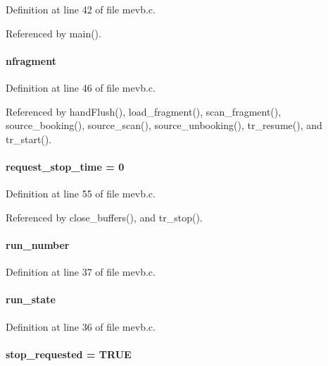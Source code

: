 Definition at line 42 of file mevb.c.

Referenced by main().
\paragraph[{nfragment}]{ {\bf nfragment}}\hfill\label{mevb_8c_ae4c245d2fd266607104c0ceb0bd946bf}


Definition at line 46 of file mevb.c.

Referenced by handFlush(), load\_\-fragment(), scan\_\-fragment(), source\_\-booking(), source\_\-scan(), source\_\-unbooking(), tr\_\-resume(), and tr\_\-start().
\paragraph[{request\_\-stop\_\-time}]{ {\bf request\_\-stop\_\-time} = 0}\hfill\label{mevb_8c_ae237aa4969c90d76e4a488ae0adaca5c}


Definition at line 55 of file mevb.c.

Referenced by close\_\-buffers(), and tr\_\-stop().
\paragraph[{run\_\-number}]{ {\bf run\_\-number}}\hfill\label{mevb_8c_a16695ea2bfd19f294afe066d6007ab36}


Definition at line 37 of file mevb.c.
\paragraph[{run\_\-state}]{ {\bf run\_\-state}}\hfill\label{mevb_8c_a81f01ccafac403262a2e430c118516a3}


Definition at line 36 of file mevb.c.
\paragraph[{stop\_\-requested}]{ {\bf stop\_\-requested} = TRUE}\hfill\label{mevb_8c_aacd845a847a6b6025d7b3601b5c0f24b}


